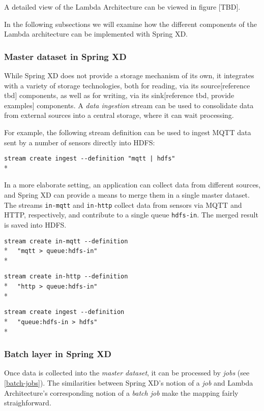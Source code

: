 A detailed view of the Lambda Architecture can be viewed in figure [TBD].

In the following subsections we will examine how the different components
of the Lambda architecture can be implemented with Spring XD.

\subsubsection {Master dataset in Spring XD}

While Spring XD does not provide a storage mechanism of its own, it 
integrates with a variety of storage technologies, both for reading,
via its source[reference tbd] components, as well as for writing, via 
its sink[reference tbd, provide examples] components. A \emph{data ingestion}
stream can be used to consolidate data from external sources into a
central storage, where it can wait processing.

For example, the following stream definition can be used to ingest 
MQTT data sent by a number of sensors directly into HDFS:

\verb;stream create ingest --definition "mqtt | hdfs";\\*

In a more elaborate setting, an application can collect data from
different sources, and Spring XD can provide a means to merge them
in a single master dataset. The streams \texttt{in-mqtt} and \texttt{in-http}
collect data from sensors via MQTT and HTTP, respectively, and
contribute to a single queue \texttt{hdfs-in}. The merged result
is saved into HDFS.

\verb;stream create in-mqtt --definition ;\\*
\verb;  "mqtt > queue:hdfs-in";\\*

\verb;stream create in-http --definition  ;\\*
\verb;  "http > queue:hdfs-in";\\*

\verb;stream create ingest --definition  ;\\*
\verb;  "queue:hdfs-in > hdfs";\\*

\subsubsection {Batch layer in Spring XD}

Once data is collected into the \emph{master dataset}, it can be processed
by \emph{jobs} (see \ref{batch-jobs}). The similarities between Spring XD's
notion of a \emph{job} and Lambda Architecture's corresponding notion of
a \emph{batch job} make the mapping fairly straighforward.

